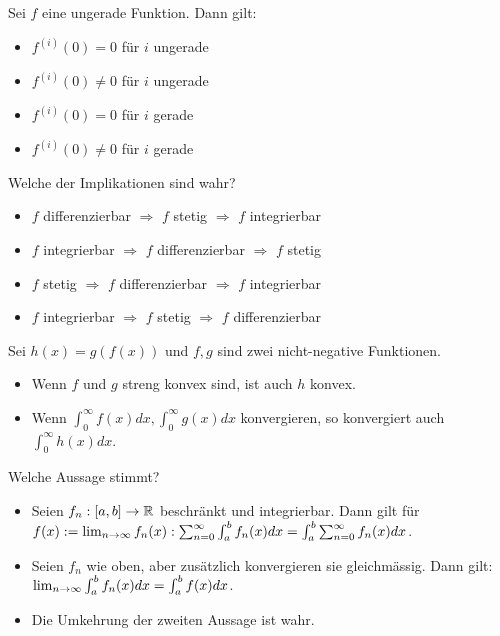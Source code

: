 Sei $f$ eine ungerade Funktion. Dann gilt:
\begin{itemize}
    \item[$\square$]
    $f^{(i)}(0) = 0$ für $i$ ungerade
    \item[$\square$]
    $f^{(i)}(0) \neq 0$ für $i$ ungerade
    \item[\rlap{\raisebox{0.3ex}{\hspace{0.4ex}\tiny \ding{52}}}$\square$]
    $f^{(i)}(0) = 0$ für $i$ gerade
    \item[$\square$]
    $f^{(i)}(0) \neq 0$ für $i$ gerade
\end{itemize}

Welche der Implikationen sind wahr?
\begin{itemize}
    \item[\rlap{\raisebox{0.3ex}{\hspace{0.4ex}\tiny \ding{52}}}$\square$]
    $f$ differenzierbar $\Rightarrow$ $f$ stetig $\Rightarrow$ $f$ integrierbar
    \item[$\square$]
    $f$ integrierbar $\Rightarrow$ $f$ differenzierbar $\Rightarrow$ $f$ stetig
    \item[$\square$]
    $f$ stetig $\Rightarrow$ $f$ differenzierbar $\Rightarrow$ $f$ integrierbar
    \item[$\square$]
    $f$ integrierbar $\Rightarrow$ $f$ stetig $\Rightarrow$ $f$ differenzierbar
\end{itemize}

Sei $h(x) = g(f(x))$ und $f,g$ sind zwei nicht-negative Funktionen. 
\begin{itemize}
    \item[$\square$]
    Wenn $f$ und $g$ streng konvex sind, ist auch $h$ konvex.
    \item[\rlap{\raisebox{0.3ex}{\hspace{0.4ex}\tiny \ding{52}}}$\square$]
    Wenn $\int_0^\infty f(x)dx, \int_0^\infty g(x)dx$ konvergieren, so konvergiert auch $\int_0^\infty h(x)dx$.
\end{itemize}

Welche Aussage stimmt?
\begin{itemize}
    \item[$\square$]
    Seien $f_n : [a,b] \to \mathbb{R}$ beschränkt und integrierbar. Dann gilt für $f(x) := \lim_{n \rightarrow \infty} f_n(x) : \sum_{n = 0}^\infty \int_a^bf_n(x)dx = \int_a^b \sum_{n = 0}^\infty f_n(x)dx$.
    \item[\rlap{\raisebox{0.3ex}{\hspace{0.4ex}\tiny \ding{52}}}$\square$]
    Seien $f_n$ wie oben, aber zusätzlich konvergieren sie gleichmässig. Dann gilt: $\lim_{n \rightarrow \infty} \int_a^b f_n(x)dx = \int_a^bf(x)dx$.
    \item[$\square$]
    Die Umkehrung der zweiten Aussage ist wahr.
\end{itemize}


